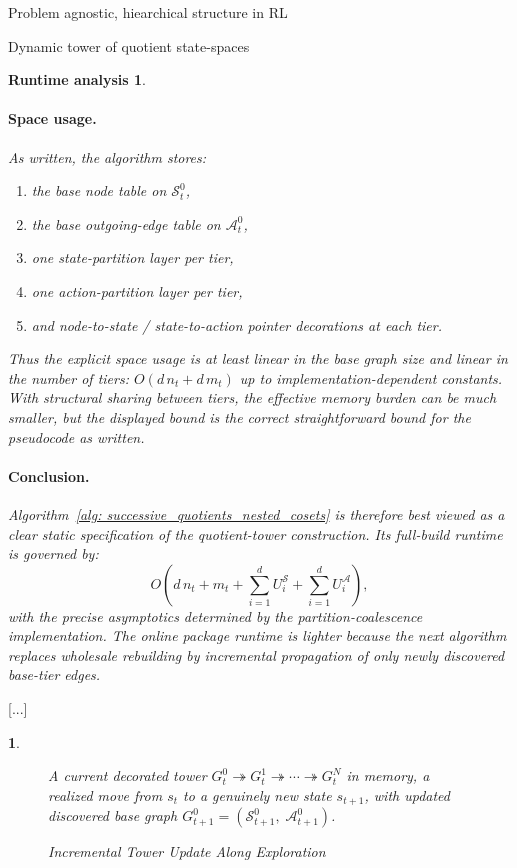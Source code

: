 \documentclass[11pt]{article}
\newtheorem{ermark}[subsubsection]{}
\newtheorem{run_analysis}[subsubsection]{Runtime analysis}
\begin{document}
\begin{section}{Problem agnostic, hiearchical structure in RL}
\begin{subsection}{Dynamic tower of quotient state-spaces}
\begin{run_analysis}
\paragraph{Space usage.}
As written, the algorithm stores:
\begin{enumerate}
    \item the base node table on $\mathcal{S}_t^0$,
    \item the base outgoing-edge table on $\mathcal{A}_t^0$,
    \item one state-partition layer per tier,
    \item one action-partition layer per tier,
    \item and node-to-state / state-to-action pointer decorations at each tier.
\end{enumerate}
Thus the explicit space usage is at least linear in the base graph size and linear in the number of tiers:
$
O(d\,n_t + d\,m_t)
$
up to implementation-dependent constants. With structural sharing between tiers, the effective memory burden can be much smaller, but the displayed bound is the correct straightforward bound for the pseudocode as written.

\paragraph{Conclusion.}
Algorithm~\ref{alg: successive_quotients_nested_cosets} is therefore best viewed as a clear \emph{static specification} of the quotient-tower construction. Its full-build runtime is governed by:
\[
O\!\left(
d\,n_t + m_t + \sum_{i=1}^d U_i^{\mathcal S} + \sum_{i=1}^d U_i^{\mathcal A}
\right),
\]
with the precise asymptotics determined by the partition-coalescence implementation. The online package runtime is lighter because the next algorithm replaces wholesale rebuilding by incremental propagation of only newly discovered base-tier edges.
\end{run_analysis}
[...]

\begin{ermark}

\begin{figure}[!h]
\begin{algorithm}[H]
\caption{Incremental Tower Update Along Exploration}
\label{alg: incremental_tower_update}
\begin{algorithmic}[1]

\Require
A current decorated tower
$
G_t^0 \twoheadrightarrow G_t^1 \twoheadrightarrow \cdots \twoheadrightarrow G_t^N
$
in memory, a realized move from $s_t$ to a genuinely new state $s_{t+1}$, with updated discovered base graph $G_{t+1}^0=(\mathcal{S}_{t+1}^0,\;\mathcal{A}_{t+1}^0)$.


\end{algorithmic}
\end{algorithm}
\end{figure}
\end{ermark}
\end{subsection}
\end{section}
\end{document}

